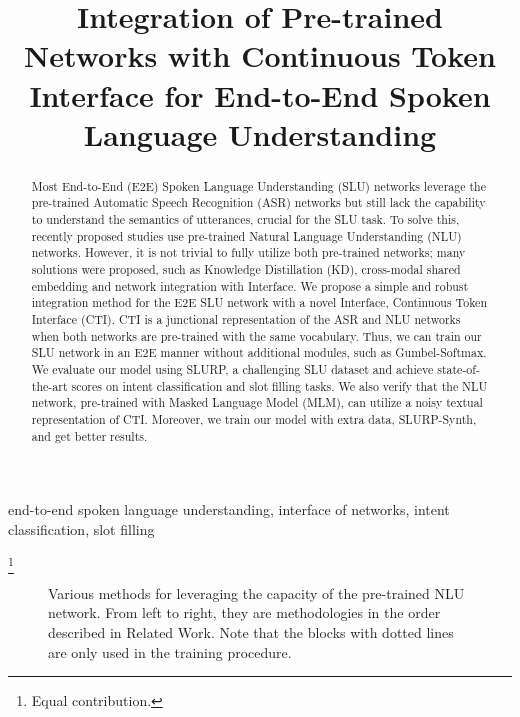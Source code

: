 \documentclass{article}
\title{Integration of Pre-trained Networks with Continuous Token Interface for End-to-End Spoken Language Understanding}
\newcommand\blfootnote[1]{\begingroup
  \renewcommand\thefootnote{}\footnote{#1}\addtocounter{footnote}{-1}\endgroup
}
\begin{document}
\maketitle




\begin{abstract}
Most End-to-End (E2E) Spoken Language Understanding (SLU) networks leverage the pre-trained Automatic Speech Recognition (ASR) networks but still lack the capability to understand the semantics of utterances, crucial for the SLU task.
To solve this, recently proposed studies use pre-trained Natural Language Understanding (NLU) networks.
However, it is not trivial to fully utilize both pre-trained networks; many solutions were proposed, such as Knowledge Distillation (KD), cross-modal shared embedding and network integration with Interface.
We propose a simple and robust integration method for the E2E SLU network with a novel Interface, Continuous Token Interface (CTI).
CTI is a junctional representation of the ASR and NLU networks when both networks are pre-trained with the same vocabulary.
Thus, we can train our SLU network in an E2E manner without additional modules, such as Gumbel-Softmax.
We evaluate our model using SLURP, a challenging SLU dataset and achieve state-of-the-art scores on intent classification and slot filling tasks.
We also verify that the NLU network, pre-trained with Masked Language Model (MLM), can utilize a noisy textual representation of CTI.
Moreover, we train our model with extra data, SLURP-Synth, and get better results.

\end{abstract}

\begin{keywords}
end-to-end spoken language understanding, interface of networks, intent classification, slot filling
\end{keywords}

\blfootnote{ Equal contribution.}





\begin{figure*}[ht!]
\centering
\hspace{-6mm}
\vspace{-2mm}\caption{Various methods for leveraging the capacity of the pre-trained NLU network. From left to right, they are methodologies in the order described in Related Work. 
Note that the blocks with dotted lines are only used in the training procedure.
}
\label{fig:e2e_slu_with_lm} 
\vspace{-6mm}\end{figure*}
\end{document}

